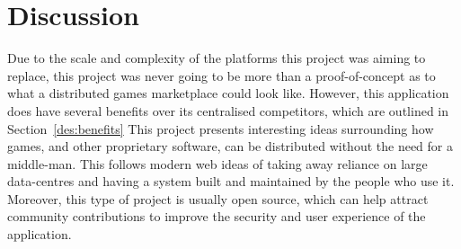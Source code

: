\section{Discussion}

Due to the scale and complexity of the platforms this project was aiming to replace, this project was never going to be more than a proof-of-concept as to what a distributed games marketplace could look like. 
However, this application does have several benefits over its centralised competitors, which are outlined in Section~\ref{des:benefits}
\x
This project presents interesting ideas surrounding how games, and other proprietary software, can be distributed without the need for a middle-man. This follows modern web ideas of taking away reliance on large data-centres and having a system built and maintained by the people who use it. Moreover, this type of project is usually open source, which can help attract community contributions to improve the security and user experience of the application.
